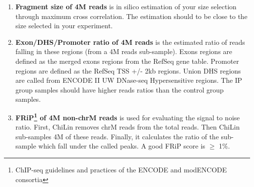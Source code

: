 \begin{enumerate}
\item{\textbf{Fragment size of 4M reads} is in silico estimation of your size selection through maximum cross correlation. The estimation should to be close to the size selected in your experiment.}
\item{\textbf{Exon/DHS/Promoter ratio of 4M reads} is the estimated ratio of reads falling in these regions (from a 4M reads sub-sample). Exons regions are defined as the merged exons regions from the RefSeq gene table. Promoter regions are defined as the RefSeq TSS +/- 2kb regions. Union DHS regions are called from ENCODE II UW DNase-seq Hypersensitive regions. The IP group samples should have higher reads ratios than the control group samples.}

\item{\textbf{FRiP\footnote{ChIP-seq guidelines and practices of the ENCODE and modENCODE consortia} of 4M non-chrM reads} is used for evaluating the signal to noise ratio. First, ChiLin removes chrM reads from the total reads. Then ChiLin sub-samples 4M of these reads. Finally, it calculates the ratio of the sub-sample which fall under the called peaks. A good FRiP score is $\geq$ 1$\%$}.


\end{enumerate}
